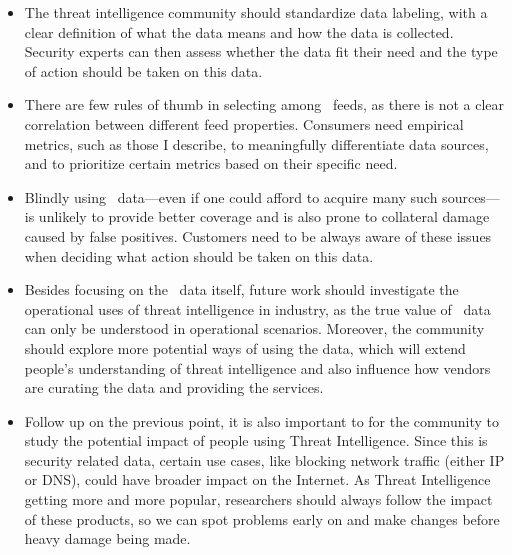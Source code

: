 \begin{itemize}
    \item The threat intelligence community should standardize data labeling,
    with a clear definition of what the data means and how the data is 
    collected. Security experts can then assess whether the data fit their 
    need and the type of action should be taken on this data.

    \item There are few rules of thumb in selecting among \ti\ feeds,
    as there is not a clear correlation between different feed properties.
    Consumers need empirical metrics, such as those I describe, to
    meaningfully differentiate data sources, and to prioritize certain 
    metrics based on their specific need.

    \item Blindly using \ti\ data---even if one could afford to acquire
    many such sources---is unlikely to provide better coverage and is
    also prone to collateral damage caused by false positives. Customers
    need to be always aware of these issues when deciding what action
    should be taken on this data.

    \item Besides focusing on the \ti\ data itself, future work should 
    investigate the operational uses of threat intelligence in industry, 
    as the true value of \ti\ data can only be understood in operational
    scenarios. Moreover, the community should explore more potential ways 
    of using the data, which will extend people's understanding of threat 
    intelligence and also influence how vendors are curating the data and
    providing the services.

    \item Follow up on the previous point, it is also important to for the
    community to study the potential impact of people using Threat 
    Intelligence. Since this is security related data, certain use cases,
    like blocking network traffic (either IP or DNS), could have broader
    impact on the Internet. As Threat Intelligence getting more and more
    popular, researchers should always follow the impact of these products,
    so we can spot problems early on and make changes before heavy damage
    being made.

\end{itemize}